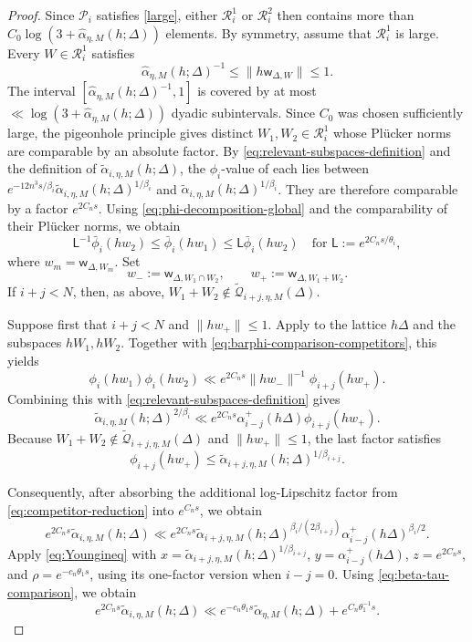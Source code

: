 \documentclass[10pt,a4paper]{amsart}
\begin{document}
\begin{proof}
Since $\mathcal P_i$ satisfies \eqref{large}, either
$\mathcal R_i^1$ or $\mathcal R_i^2$ then contains more than
$C_0\log(3+\widehat{\alpha}_{\eta,M}(h;\Delta))$ elements. By symmetry, assume that
$\mathcal R_i^1$ is large. Every
$W\in\mathcal R_i^1$ satisfies
$$
\widehat{\alpha}_{\eta,M}(h;\Delta)^{-1}
\le\|h\mathsf w_{\Delta,W}\|\le1.
$$
The interval
$[\widehat{\alpha}_{\eta,M}(h;\Delta)^{-1},1]$ is covered by at most
$\ll \log(3+\widehat{\alpha}_{\eta,M}(h;\Delta))$ dyadic
subintervals. Since $C_0$ was chosen sufficiently
large, the pigeonhole principle gives distinct
$W_1,W_2\in\mathcal R_i^1$ whose Pl\"ucker norms are comparable by an
absolute factor. By \eqref{eq:relevant-subspaces-definition} and the
definition of $\widetilde\alpha_{i,\eta,M}(h;\Delta)$, the
$\phi_i$-value of each lies between
$e^{-12n^3s/\beta_i}\widetilde\alpha_{i,\eta,M}(h;\Delta)^{1/\beta_i}$ and
$\widetilde\alpha_{i,\eta,M}(h;\Delta)^{1/\beta_i}$. They are therefore comparable by a factor
$e^{2C_ns}$. Using \eqref{eq:phi-decomposition-global} and the comparability
of their Pl\"ucker norms, we obtain
\begin{equation}\label{eq:barphi-comparison-competitors}
\mathsf L^{-1}\bar\phi_i(hw_2)
\le\bar\phi_i(hw_1)
\le\mathsf L\bar\phi_i(hw_2) \quad\text{for }\mathsf L:= e^{2C_ns/\theta_i},
\end{equation}
 where $w_m=\mathsf w_{\Delta,W_m}$. Set
$$
w_-:=\mathsf w_{\Delta,W_1\cap W_2},
\qquad
w_+:=\mathsf w_{\Delta,W_1+W_2}.
$$
If $i+j<N$, then, as above,
$W_1+W_2\notin\widetilde{\mathscr Q}_{i+j,\eta,M}(\Delta)$.

 Suppose first that $i+j<N$ and $\|hw_+\|\le1$.  Apply
 to the lattice $h\Delta$ and the subspaces
$hW_1,hW_2$. Together with
\eqref{eq:barphi-comparison-competitors}, this yields
$$
\phi_i(hw_1)\phi_i(hw_2)
\ll e^{2C_ns}
\|hw_-\|^{-1}\phi_{i+j}(hw_+).
$$
Combining this with \eqref{eq:relevant-subspaces-definition} gives
$$
\widetilde\alpha_{i,\eta,M}(h;\Delta)^{2/\beta_i}
\ll
e^{2C_ns}
\alpha_{i-j}^+(h\Delta)
\phi_{i+j}(hw_+).
$$
Because $W_1+W_2\notin\widetilde{\mathscr Q}_{i+j,\eta,M}(\Delta)$ and
$\|hw_+\|\le1$, the last factor satisfies
$$
\phi_{i+j}(hw_+)
\le
\widetilde\alpha_{i+j,\eta,M}(h;\Delta)^{1/\beta_{i+j}}.
$$

Consequently, after absorbing the additional log-Lipschitz factor from
\eqref{eq:competitor-reduction} into $e^{C_ns}$, we obtain
$$
e^{2C_ns}\widetilde\alpha_{i,\eta,M}(h;\Delta)\ll e^{2C_ns}
\widetilde\alpha_{i+j,\eta,M}(h;\Delta)^{\beta_i/(2\beta_{i+j})}
\alpha_{i-j}^+(h\Delta)^{\beta_i/2}.
$$
Apply \eqref{eq:Youngineq} with
$x=\widetilde\alpha_{i+j,\eta,M}(h;\Delta)^{1/\beta_{i+j}}$,
$y=\alpha_{i-j}^+(h\Delta)$, $z=e^{2C_ns}$, and
$\rho=e^{-c_n\theta_1s}$, using its one-factor version when $i-j=0$.
Using
\eqref{eq:beta-tau-comparison}, we obtain
\begin{equation}\label{eq:R1-Mother-contraction}
e^{2C_ns}\widetilde\alpha_{i,\eta,M}(h;\Delta)
\ll e^{-c_n\theta_1 s}\widetilde\alpha_{\eta,M}(h;\Delta)
+e^{C_n\theta_1^{-1}s}.
\end{equation}


\end{proof}
\end{document}
